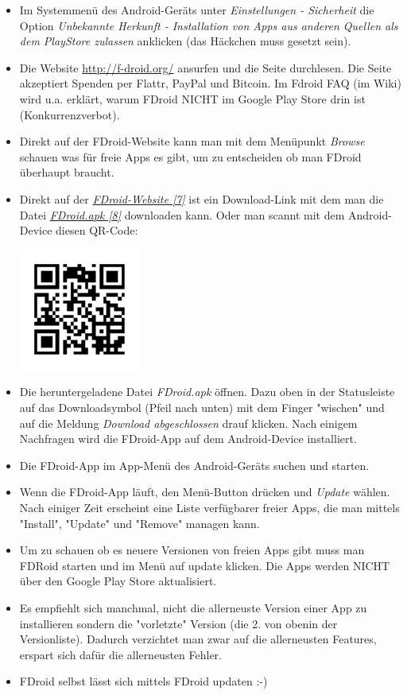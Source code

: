 \begin{itemize}
\item Im Systemmenü des Android-Geräts unter \emph{Einstellungen - Sicherheit} die Option \emph{Unbekannte Herkunft - Installation von Apps aus anderen Quellen als dem PlayStore zulassen} anklicken (das Häckchen muss gesetzt sein).
\item Die Website \url{http://f-droid.org/} ansurfen und die Seite durchlesen. Die Seite akzeptiert Spenden per Flattr, PayPal und Bitcoin. Im Fdroid FAQ (im Wiki) wird u.a. erklärt, warum FDroid NICHT im Google Play Store drin ist (Konkurrenzverbot).
\item Direkt auf der FDroid-Website kann man mit dem Menüpunkt \emph{Browse} schauen was für freie Apps es gibt, um zu entscheiden ob man FDroid überhaupt braucht.
\item Direkt auf der \href{http://f-droid.org/}{\textit{FDroid-Website [7]}} ist ein Download-Link mit dem man die Datei \href{http://f-droid.org/FDroid.apk}{\textit{FDroid.apk [8]}} downloaden kann. Oder man scannt mit dem Android-Device diesen QR-Code:

\begin{center}
\includegraphics[width=4cm]{fdroid/fdroidurl.png}
\end{center}

\item Die heruntergeladene Datei \emph{FDroid.apk} öffnen. Dazu oben in der Statusleiste auf das Downloadsymbol (Pfeil nach unten) mit dem Finger "wischen" und auf die Meldung \emph{Download abgeschlossen} drauf klicken. Nach einigem Nachfragen wird die FDroid-App auf dem Android-Device installiert.
\item Die FDroid-App im App-Menü des Android-Geräts suchen und starten.
\item Wenn die FDroid-App läuft, den Menü-Button drücken und \emph{Update} wählen. Nach einiger Zeit erscheint eine Liste verfügbarer freier Apps, die man mittels "Install", "Update" und "Remove" managen kann.
\item Um zu schauen ob es neuere Versionen von freien Apps gibt muss man FDRoid starten und im Menü auf update klicken. Die Apps werden NICHT über den Google Play Store aktualisiert.
\item Es empfiehlt sich manchmal, nicht die allerneuste Version einer App zu installieren sondern die "vorletzte" Version (die 2. von obenin der Versionliste). Dadurch verzichtet man zwar auf die allerneusten Features, erspart sich dafür die allerneusten Fehler.
\item FDroid selbst lässt sich mittels FDroid updaten :-)
\end{itemize}

